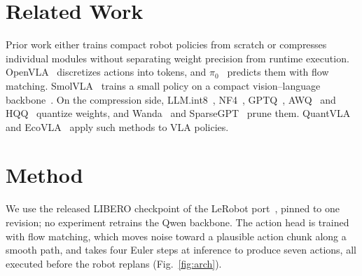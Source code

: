 \documentclass[conference]{IEEEtran}
\begin{document}
\section{Related Work}
Prior work either trains compact robot policies from scratch or compresses individual modules without separating weight precision from runtime execution. OpenVLA~\cite{openvla} discretizes actions into tokens, and $\pi_0$~\cite{pi0} predicts them with flow matching. SmolVLA~\cite{smolvla} trains a small policy on a compact vision--language backbone~\cite{smolvlm}. On the compression side, LLM.int8~\cite{llmint8}, NF4~\cite{qlora}, GPTQ~\cite{gptq}, AWQ~\cite{awq} and HQQ~\cite{hqq} quantize weights, and Wanda~\cite{wanda} and SparseGPT~\cite{sparsegpt} prune them. QuantVLA~\cite{quantvla} and EcoVLA~\cite{ecovla} apply such methods to VLA policies.

\section{Method}
We use the released LIBERO checkpoint of the LeRobot port~\cite{lerobot}, pinned to one revision; no experiment retrains the Qwen backbone. The action head is trained with flow matching, which moves noise toward a plausible action chunk along a smooth path, and takes four Euler steps at inference to produce seven actions, all executed before the robot replans (Fig.~\ref{fig:arch}).
\end{document}
